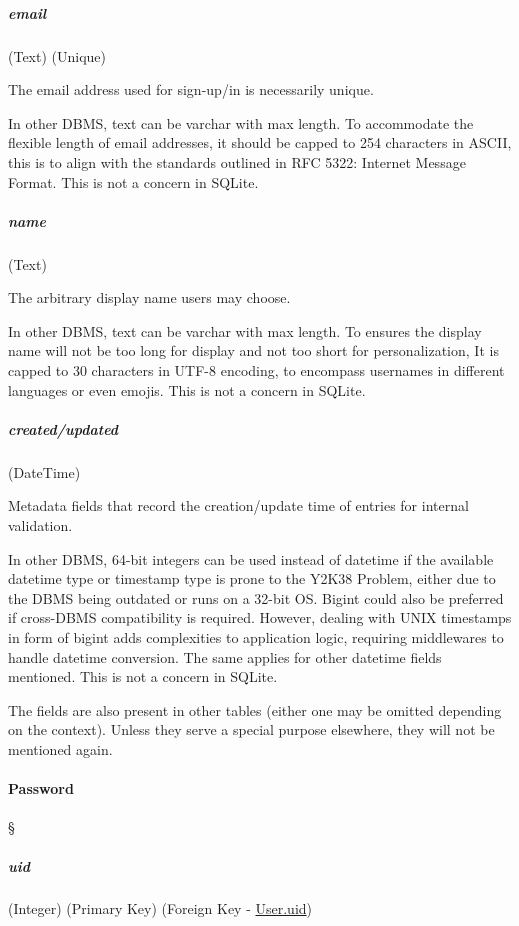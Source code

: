 \subparagraph{email}
(Text) (Unique) \label{data-layer.design.user.tables.user.email}

The email address used for sign-up/in is necessarily unique.

\textdagger{} In other DBMS, text can be varchar with max length. To accommodate
the flexible length of email addresses, it should be capped to 254 characters in
ASCII, this is to align with the standards outlined in RFC 5322: Internet Message
Format. This is not a concern in SQLite.

\subparagraph{name}
(Text) \label{data-layer.design.user.tables.user.name}

The arbitrary display name users may choose.

\textdagger{} In other DBMS, text can be varchar with max length. To ensures the
display name will not be too long for display and not too short for personalization,
It is capped to 30 characters in UTF-8 encoding, to encompass usernames in different
languages or even emojis. This is not a concern in SQLite.

\subparagraph{created/updated}
(DateTime) \label{data-layer.design.user.tables.user.meta}

Metadata fields that record the creation/update time of entries for internal
validation.

\textdagger{} In other DBMS, 64-bit integers can be used instead of datetime if
the available datetime type or timestamp type is prone to the Y2K38 Problem, either
due to the DBMS being outdated or runs on a 32-bit OS. Bigint could also be
preferred if cross-DBMS compatibility is required. However, dealing with UNIX
timestamps in form of bigint adds complexities to application logic, requiring middlewares
to handle datetime conversion. The same applies for other datetime fields
mentioned. This is not a concern in SQLite.

The fields are also present in other tables (either one may be omitted depending
on the context). Unless they serve a special purpose elsewhere, they will not be
mentioned again.

\paragraph{Password}
\S{} \label{data-layer.design.user.tables.pswd}

\subparagraph{uid}
(Integer) (Primary Key) (Foreign Key -
\hyperref[data-layer.design.user.tables.user.uid]{User.uid}) \label{data-layer.design.user.tables.pswd.uid}

